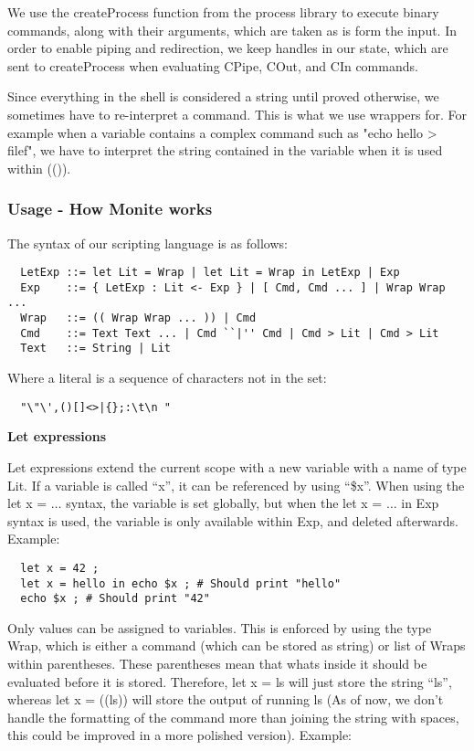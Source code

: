 \documentclass[11pt,a4paper]{article}
\begin{document}
We use the createProcess function from the process library to execute binary
commands, along with their arguments, which are taken as is form the input. In
order to enable piping and redirection, we keep handles in our state, which are
sent to createProcess when evaluating CPipe, COut, and CIn commands.

Since everything in the shell is considered a string until proved otherwise, we
sometimes have to re-interpret a command. This is what we use wrappers for.  For
example when a variable contains a complex command such as "echo hello > filef",
we have to interpret the string contained in the variable when it is used within
(()).

\subsubsection{Usage - How Monite works}
\label{features}
The syntax of our scripting language is as follows:

\begin{verbatim}
  LetExp ::= let Lit = Wrap | let Lit = Wrap in LetExp | Exp
  Exp    ::= { LetExp : Lit <- Exp } | [ Cmd, Cmd ... ] | Wrap Wrap ...
  Wrap   ::= (( Wrap Wrap ... )) | Cmd
  Cmd    ::= Text Text ... | Cmd ``|'' Cmd | Cmd > Lit | Cmd > Lit
  Text   ::= String | Lit
\end{verbatim}

Where a literal is a sequence of characters not in the set:
\begin{verbatim}
  "\"\',()[]<>|{};:\t\n "
\end{verbatim}

\textbf{Let expressions}

Let expressions extend the current scope with a new variable with a name of
type Lit. If a variable is called ``x'', it can be referenced by using ``\$x''.
When using the let x = $\dots$ syntax, the variable is set globally, but when
the let x = $\dots$ in Exp syntax is used, the variable is only available
within Exp, and deleted afterwards. Example:

\begin{verbatim}
  let x = 42 ;
  let x = hello in echo $x ; # Should print "hello"
  echo $x ; # Should print "42"
\end{verbatim}

Only values can be assigned to variables. This is enforced by using the type
Wrap, which is either a command (which can be stored as string) or list of
Wraps within parentheses. These parentheses mean that whats inside it should be
evaluated before it is stored. Therefore, let x = ls will just store the string
``ls'', whereas let x = ((ls)) will store the output of running ls (As of now,
we don't handle the formatting of the command more than joining the string with
spaces, this could be improved in a more polished version). Example:
\end{document}
